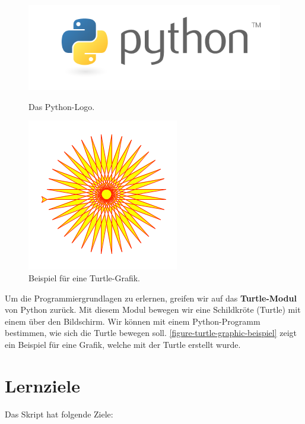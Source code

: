 \begin{figure}[htb]
\centering
\begin{minipage}[b][][b]{0.4\textwidth}
\centering 
\includegraphics[scale=0.3]{python-logo}
\caption{Das Python-Logo.}
\label{figure-python-logo}
\end{minipage}
\hfill
\begin{minipage}[b][][b]{0.5\textwidth}
\centering
\includegraphics[scale=0.4]{turtle-star}
\caption{Beispiel für eine Turtle-Grafik.}
\label{figure-turtle-graphic-beispiel}
\end{minipage}
\end{figure}

Um die Programmiergrundlagen zu erlernen, greifen wir auf das \textbf{Turtle-Modul} von Python zurück. Mit diesem Modul bewegen wir eine Schildkröte (Turtle) mit einem  über den Bildschirm. Wir können mit einem Python-Programm bestimmen, wie sich die Turtle bewegen soll. \autoref{figure-turtle-graphic-beispiel} zeigt ein Beispiel für eine Grafik, welche mit der Turtle erstellt wurde.

\section{Lernziele}

Das Skript hat folgende Ziele:

